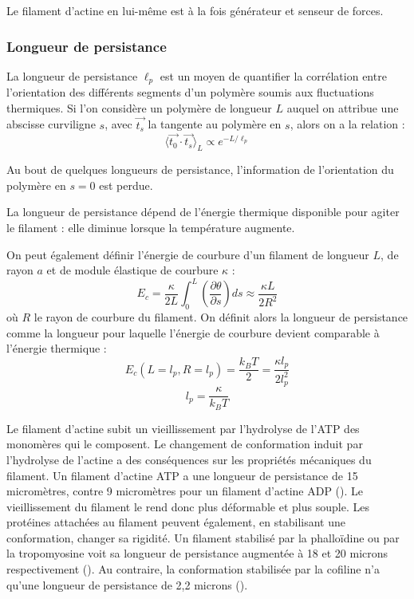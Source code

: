 Le filament d'actine en lui-même est à la fois générateur et senseur de forces. 

 \subsubsection{Longueur de persistance}
La longueur de persistance $\ell_p$ est un moyen de quantifier la corrélation entre l'orientation des différents segments d'un polymère soumis aux fluctuations thermiques. Si l'on considère un polymère de longueur $L$ auquel on attribue une abscisse curviligne $s$, avec $\vec{t_s}$ la tangente au polymère en $s$, alors on a la relation : 
$$ \langle \vec{t_0}\cdot \vec{t_s} \rangle_L \propto e^{-L/\ell_p}$$

Au bout de quelques longueurs de persistance, l'information de l'orientation du polymère en $s=0$ est perdue. 

La longueur de persistance dépend de l'énergie thermique disponible pour agiter le filament : elle diminue lorsque la température augmente. 

On peut également définir l'énergie de courbure d'un filament de longueur $L$, de rayon $a$ et de module élastique de courbure $\kappa$ : 
$$ E_c= \frac{\kappa}{2L} \int_0^L \left( \frac{\partial \theta}{\partial s} \right) ds \approx \frac{\kappa L}{2R^2}$$
 où $R$ le rayon de courbure du filament.  
 On définit alors la longueur de persistance comme la longueur pour laquelle l'énergie de courbure devient comparable à l'énergie thermique : 
 $$ E_c (L=l_p,R=l_p) = \frac{k_B T}{2} = \frac{\kappa l_p}{2 l_p^2}$$ 
 $$ l_p = \frac{\kappa}{k_B T}$$
 
 
Le filament d'actine subit un vieillissement par l'hydrolyse de l'ATP des monomères qui le composent. Le changement de conformation induit par l'hydrolyse de l'actine a des conséquences sur les propriétés mécaniques du filament. 
Un filament d'actine ATP a une longueur de persistance de 15 micromètres, contre 9 micromètres pour un filament d'actine ADP (\cite{isambert_flexibility_1995}). Le vieillissement du filament le rend donc plus déformable et plus souple. 
Les protéines attachées au filament peuvent également, en stabilisant une conformation, changer sa rigidité. Un filament stabilisé par la phalloïdine ou par la tropomyosine voit sa longueur de persistance augmentée à 18 et 20 microns respectivement (\cite{isambert_flexibility_1995}). Au contraire, la conformation stabilisée par la cofiline n'a qu'une longueur de persistance de 2,2 microns (\cite{mccullough_cofilin_2008}). 


